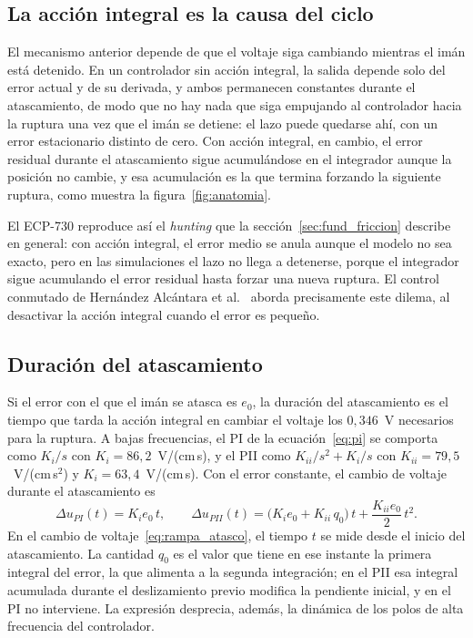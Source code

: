 \subsection{La acción integral es la causa del ciclo}

El mecanismo anterior depende de que el voltaje siga cambiando mientras el imán está detenido. En un controlador sin acción integral, la salida depende solo del error actual y de su derivada, y ambos permanecen constantes durante el atascamiento, de modo que no hay nada que siga empujando al controlador hacia la ruptura una vez que el imán se detiene: el lazo puede quedarse ahí, con un error estacionario distinto de cero. Con acción integral, en cambio, el error residual durante el atascamiento sigue acumulándose en el integrador aunque la posición no cambie, y esa acumulación es la que termina forzando la siguiente ruptura, como muestra la figura~\ref{fig:anatomia}.

El ECP-730 reproduce así el \emph{hunting} que la sección~\ref{sec:fund_friccion} describe en general: con acción integral, el error medio se anula aunque el modelo no sea exacto, pero en las simulaciones el lazo no llega a detenerse, porque el integrador sigue acumulando el error residual hasta forzar una nueva ruptura. El control conmutado de Hernández Alcántara et al.~\cite{alcantara} aborda precisamente este dilema, al desactivar la acción integral cuando el error es pequeño.

\subsection{Duración del atascamiento}

Si el error con el que el imán se atasca es $e_0$, la duración del atascamiento es el tiempo que tarda la acción integral en cambiar el voltaje los $0{,}346$~V necesarios para la ruptura. A bajas frecuencias, el PI de la ecuación~\eqref{eq:pi} se comporta como $K_i/s$ con $K_i=86{,}2$~V/(cm\,s), y el PII como $K_{ii}/s^2 + K_i/s$ con $K_{ii}=79{,}5$~V/(cm\,s$^2$) y $K_i=63{,}4$~V/(cm\,s). Con el error constante, el cambio de voltaje durante el atascamiento es
\begin{equation}
\Delta u_{PI}(t) = K_i e_0\, t, \qquad
\Delta u_{PII}(t) = \big(K_i e_0 + K_{ii}\, q_0\big)\, t + \frac{K_{ii} e_0}{2}\, t^2 .
\label{eq:rampa_atasco}
\end{equation}
En el cambio de voltaje~\eqref{eq:rampa_atasco}, el tiempo $t$ se mide desde el inicio del atascamiento. La cantidad $q_0$ es el valor que tiene en ese instante la primera integral del error, la que alimenta a la segunda integración; en el PII esa integral acumulada durante el deslizamiento previo modifica la pendiente inicial, y en el PI no interviene. La expresión desprecia, además, la dinámica de los polos de alta frecuencia del controlador.

